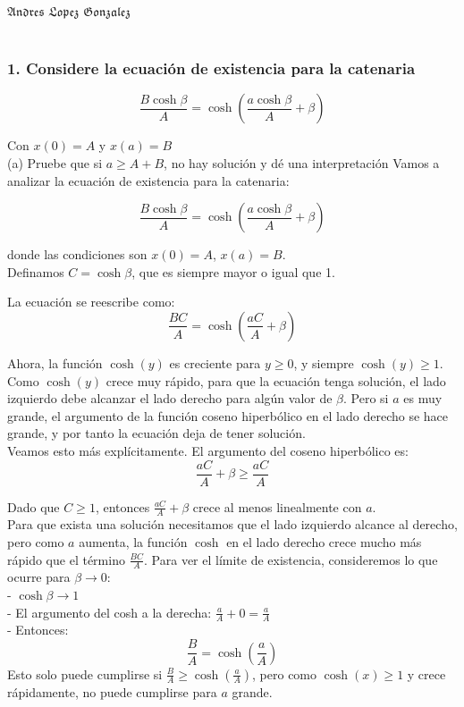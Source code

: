 \documentclass{article}
\theoremstyle{nonumberplain}
\begin{document}
\hspace{12cm}$\mathfrak{Andres \,\, Lopez \,\, Gonzalez}$\\\\

\subsubsection*{1. Considere la ecuación de existencia para la catenaria}
\[
\frac{B \cosh \beta}{A}=\cosh \left(\frac{a \cosh \beta}{A}+\beta\right)
\]

Con \( x(0)=A \) y \( x(a)=B \) \\
(a) Pruebe que si \( a \geq A+B \), no hay solución y dé una interpretación Vamos a analizar la ecuación de existencia para la catenaria:

\[
\frac{B \cosh \beta}{A} = \cosh \left(\frac{a \cosh \beta}{A} + \beta \right)
\]

donde las condiciones son \( x(0) = A \), \( x(a) = B \). \\


Definamos \( C = \cosh \beta \), que es siempre mayor o igual que 1.

La ecuación se reescribe como:
\[
\frac{B C}{A} = \cosh \left( \frac{a C}{A} + \beta \right)
\]

Ahora, la función \( \cosh(y) \) es creciente para \( y \geq 0 \), y siempre \( \cosh(y) \geq 1 \). Como \( \cosh(y) \) crece muy rápido, para que la ecuación tenga solución, el lado izquierdo debe alcanzar el lado derecho para algún valor de \( \beta \). Pero si \( a \) es muy grande, el argumento de la función coseno hiperbólico en el lado derecho se hace grande, y por tanto la ecuación deja de tener solución. \\

Veamos esto más explícitamente. El argumento del coseno hiperbólico es:
\[
\frac{a C}{A} + \beta \geq \frac{a C}{A}
\]

Dado que \( C \geq 1 \), entonces \( \frac{a C}{A} + \beta \) crece al menos linealmente con \( a \). \\

Para que exista una solución necesitamos que el lado izquierdo alcance al derecho, pero como \( a \) aumenta, la función \( \cosh \) en el lado derecho crece mucho más rápido que el término \( \frac{B C}{A} \). Para ver el límite de existencia, consideremos lo que ocurre para \( \beta \to 0 \): \\

- \( \cosh \beta \to 1 \) \\
- El argumento del cosh a la derecha: \( \frac{a}{A} + 0 = \frac{a}{A} \) \\
- Entonces:
  \[
  \frac{B}{A} = \cosh\left(\frac{a}{A}\right)
  \]
  Esto solo puede cumplirse si \( \frac{B}{A} \geq \cosh\left(\frac{a}{A}\right) \), pero como \( \cosh(x) \geq 1 \) y crece rápidamente, no puede cumplirse para \( a \) grande. \\
\end{document}
